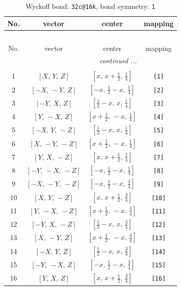\documentclass[fleqn,8pt]{jsarticle}
\begin{document}
\begin{longtable}{cccc}
\caption{Wyckoff bond: {\tt 32c@16k}, bond symmetry: {\tt 1}}
 \\
 \hline \hline
No. & vector & center & mapping \\ \hline \endfirsthead

\multicolumn{3}{l}{\tablename\ \thetable{}} \\
 \hline \hline
No. & vector & center & mapping \\ \hline \endhead

 \hline \hline
\multicolumn{3}{r}{\footnotesize\it continued ...} \\ \endfoot

 \hline \hline
\multicolumn{3}{r}{} \\ \endlastfoot

1 & $\left[ X,\, Y,\, Z \right]$ & $\left[ x,\, x + \frac{1}{2},\, \frac{1}{4} \right]$ & {\tt [1]} \\ \hline
2 & $\left[ - X,\, - Y,\, Z \right]$ & $\left[ - x,\, \frac{1}{2} - x,\, \frac{1}{4} \right]$ & {\tt [2]} \\ \hline
3 & $\left[ - Y,\, X,\, Z \right]$ & $\left[ \frac{1}{2} - x,\, x,\, \frac{1}{4} \right]$ & {\tt [3]} \\ \hline
4 & $\left[ Y,\, - X,\, Z \right]$ & $\left[ x + \frac{1}{2},\, - x,\, \frac{1}{4} \right]$ & {\tt [4]} \\ \hline
5 & $\left[ - X,\, Y,\, - Z \right]$ & $\left[ \frac{1}{2} - x,\, x,\, \frac{1}{4} \right]$ & {\tt [5]} \\ \hline
6 & $\left[ X,\, - Y,\, - Z \right]$ & $\left[ x + \frac{1}{2},\, - x,\, \frac{1}{4} \right]$ & {\tt [6]} \\ \hline
7 & $\left[ Y,\, X,\, - Z \right]$ & $\left[ x,\, x + \frac{1}{2},\, \frac{1}{4} \right]$ & {\tt [7]} \\ \hline
8 & $\left[ - Y,\, - X,\, - Z \right]$ & $\left[ - x,\, \frac{1}{2} - x,\, \frac{1}{4} \right]$ & {\tt [8]} \\ \hline
9 & $\left[ - X,\, - Y,\, - Z \right]$ & $\left[ - x,\, \frac{1}{2} - x,\, \frac{3}{4} \right]$ & {\tt [9]} \\ \hline
10 & $\left[ X,\, Y,\, - Z \right]$ & $\left[ x,\, x + \frac{1}{2},\, \frac{3}{4} \right]$ & {\tt [10]} \\ \hline
11 & $\left[ Y,\, - X,\, - Z \right]$ & $\left[ x + \frac{1}{2},\, - x,\, \frac{3}{4} \right]$ & {\tt [11]} \\ \hline
12 & $\left[ - Y,\, X,\, - Z \right]$ & $\left[ \frac{1}{2} - x,\, x,\, \frac{3}{4} \right]$ & {\tt [12]} \\ \hline
13 & $\left[ X,\, - Y,\, Z \right]$ & $\left[ x + \frac{1}{2},\, - x,\, \frac{3}{4} \right]$ & {\tt [13]} \\ \hline
14 & $\left[ - X,\, Y,\, Z \right]$ & $\left[ \frac{1}{2} - x,\, x,\, \frac{3}{4} \right]$ & {\tt [14]} \\ \hline
15 & $\left[ - Y,\, - X,\, Z \right]$ & $\left[ - x,\, \frac{1}{2} - x,\, \frac{3}{4} \right]$ & {\tt [15]} \\ \hline
16 & $\left[ Y,\, X,\, Z \right]$ & $\left[ x,\, x + \frac{1}{2},\, \frac{3}{4} \right]$ & {\tt [16]} \\
\end{longtable}
\end{document}
